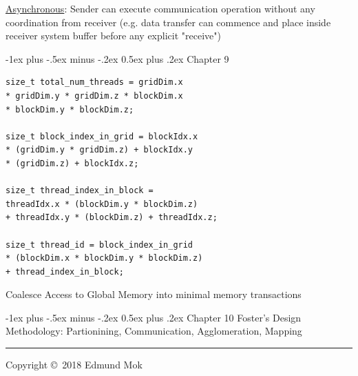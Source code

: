 \documentclass[8pt,landscape]{article}
\makeatletter
\renewcommand{\section}{\@startsection{section}{1}{0mm}%
                                {-1ex plus -.5ex minus -.2ex}%
                                {0.5ex plus .2ex}%
                                {\normalfont\large\bfseries}}
\makeatother
\begin{document}
\begin{multicols}{4}
\smallbreak \noindent \underline{Asynchronous}: Sender can execute communication operation without any coordination from receiver (e.g. data transfer can commence and place inside receiver system buffer before any explicit "receive")

\section{Chapter 9}
\begin{verbatim}
size_t total_num_threads = gridDim.x 
* gridDim.y * gridDim.z * blockDim.x 
* blockDim.y * blockDim.z;

size_t block_index_in_grid = blockIdx.x 
* (gridDim.y * gridDim.z) + blockIdx.y 
* (gridDim.z) + blockIdx.z;

size_t thread_index_in_block = 
threadIdx.x * (blockDim.y * blockDim.z)
+ threadIdx.y * (blockDim.z) + threadIdx.z;

size_t thread_id = block_index_in_grid 
* (blockDim.x * blockDim.y * blockDim.z)
+ thread_index_in_block;
\end{verbatim}
Coalesce Access to Global Memory into minimal memory transactions

\section{Chapter 10}
Foster's Design Methodology: Partionining, Communication, Agglomeration, Mapping


\rule{0.3\linewidth}{0.25pt}
\scriptsize
Copyright \copyright\ 2018 Edmund Mok

\end{multicols}
\end{document}
